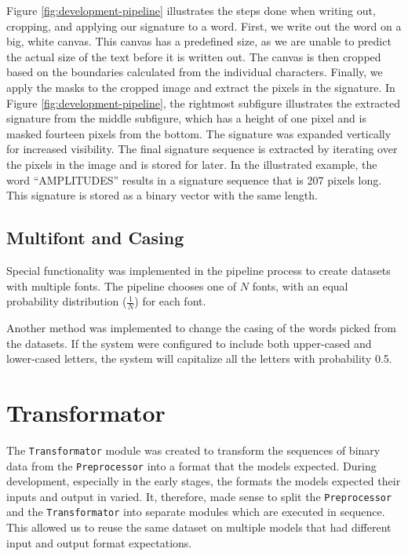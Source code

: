 Figure \ref{fig:development-pipeline} illustrates the steps done when writing out, cropping, and applying our signature to a word. First, we write out the word on a big, white canvas. This canvas has a predefined size, as we are unable to predict the actual size of the text before it is written out. The canvas is then cropped based on the boundaries calculated from the individual characters. Finally, we apply the masks to the cropped image and extract the pixels in the signature. In Figure \ref{fig:development-pipeline}, the rightmost subfigure illustrates the extracted signature from the middle subfigure, which has a height of one pixel and is masked fourteen pixels from the bottom. The signature was expanded vertically for increased visibility. The final signature sequence is extracted by iterating over the pixels in the image and is stored for later. In the illustrated example, the word ``AMPLITUDES'' results in a signature sequence that is 207 pixels long. This signature is stored as a binary vector with the same length.

\subsection{Multifont and Casing}
Special functionality was implemented in the pipeline process to create datasets with multiple fonts. The pipeline chooses one of \(N\) fonts, with an equal probability distribution (\(\frac{1}{N}\)) for each font.

Another method was implemented to change the casing of the words picked from the datasets. If the system were configured to include both upper-cased and lower-cased letters, the system will capitalize all the letters with probability 0.5.


\section{Transformator}
\label{sec:transformator}
The {\tt Transformator} module was created to transform the sequences of binary data from the {\tt Preprocessor} into a format that the models expected. During development, especially in the early stages, the formats the models expected their inputs and output in varied. It, therefore, made sense to split the {\tt Preprocessor} and the {\tt Transformator} into separate modules which are executed in sequence. This allowed us to reuse the same dataset on multiple models that had different input and output format expectations.

